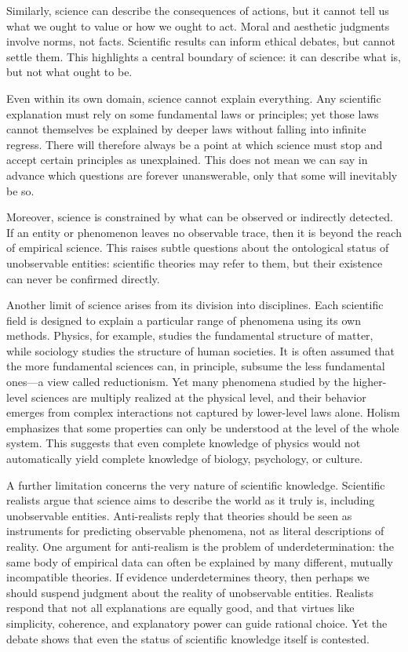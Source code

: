 Similarly, science can describe the consequences of actions, but it cannot tell us what we ought to value or how we ought to act. Moral and aesthetic judgments involve norms, not facts. Scientific results can inform ethical debates, but cannot settle them. This highlights a central boundary of science: it can describe what is, but not what ought to be.

Even within its own domain, science cannot explain everything. Any scientific explanation must rely on some fundamental laws or principles; yet those laws cannot themselves be explained by deeper laws without falling into infinite regress. There will therefore always be a point at which science must stop and accept certain principles as unexplained. This does not mean we can say in advance which questions are forever unanswerable, only that some will inevitably be so.

Moreover, science is constrained by what can be observed or indirectly detected. If an entity or phenomenon leaves no observable trace, then it is beyond the reach of empirical science. This raises subtle questions about the ontological status of unobservable entities: scientific theories may refer to them, but their existence can never be confirmed directly.

Another limit of science arises from its division into disciplines. Each scientific field is designed to explain a particular range of phenomena using its own methods. Physics, for example, studies the fundamental structure of matter, while sociology studies the structure of human societies. It is often assumed that the more fundamental sciences can, in principle, subsume the less fundamental ones—a view called reductionism. Yet many phenomena studied by the higher-level sciences are multiply realized at the physical level, and their behavior emerges from complex interactions not captured by lower-level laws alone. Holism emphasizes that some properties can only be understood at the level of the whole system. This suggests that even complete knowledge of physics would not automatically yield complete knowledge of biology, psychology, or culture.

A further limitation concerns the very nature of scientific knowledge. Scientific realists argue that science aims to describe the world as it truly is, including unobservable entities. Anti-realists reply that theories should be seen as instruments for predicting observable phenomena, not as literal descriptions of reality. One argument for anti-realism is the problem of underdetermination: the same body of empirical data can often be explained by many different, mutually incompatible theories. If evidence underdetermines theory, then perhaps we should suspend judgment about the reality of unobservable entities. Realists respond that not all explanations are equally good, and that virtues like simplicity, coherence, and explanatory power can guide rational choice. Yet the debate shows that even the status of scientific knowledge itself is contested.


